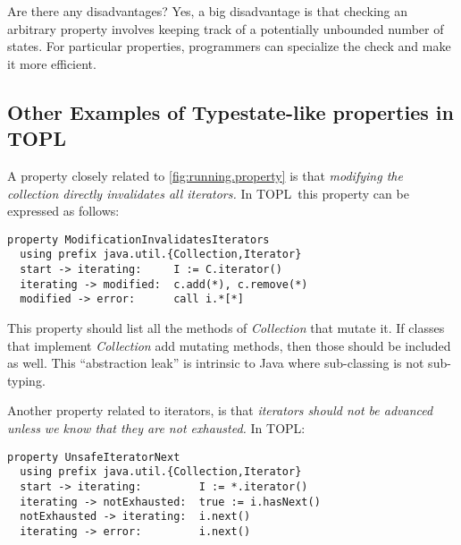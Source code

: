 \documentclass[preprint]{sigplanconf} %
\newcommand{\TPL}{TOPL}
\theoremstyle{definition}
\theoremstyle{remark}
\begin{document}
Are there any disadvantages?
Yes, a big disadvantage is that checking an arbitrary property involves keeping track of a potentially unbounded number of states.
For particular properties, programmers can specialize the check and make it more efficient.

\subsection{Other Examples of Typestate-like properties in \TPL} \label{sec:example.others} %
A property closely related to \autoref{fig:running.property} is that 
{\it modifying the collection directly invalidates all iterators.}
%
In \TPL \ this  property can be expressed as follows:
%
\par\medskip\noindent
\begin{Verbatim}
property ModificationInvalidatesIterators
  using prefix java.util.{Collection,Iterator}
  start -> iterating:     I := C.iterator()
  iterating -> modified:  c.add(*), c.remove(*)
  modified -> error:      call i.*[*]
\end{Verbatim}
\par\medskip\noindent This property should list all the methods of \textit{Collection} that mutate it.
If classes that implement \textit{Collection} add mutating methods, then those should be included as well.
This ``abstraction leak'' is intrinsic to Java where sub-classing is not sub-typing.

Another property related to iterators, is that {\it iterators should not be advanced unless we know that they are not exhausted.} 
In \TPL:
\par\medskip\noindent
\begin{Verbatim}
property UnsafeIteratorNext
  using prefix java.util.{Collection,Iterator}
  start -> iterating:         I := *.iterator()
  iterating -> notExhausted:  true := i.hasNext()
  notExhausted -> iterating:  i.next()
  iterating -> error:         i.next()
\end{Verbatim}
\par\medskip
\end{document}
